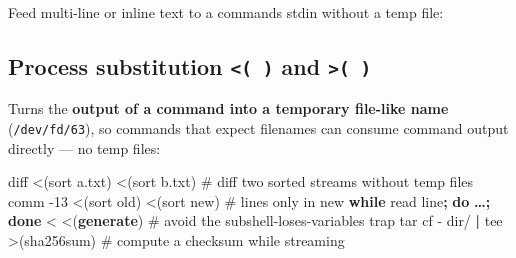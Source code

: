 \documentclass[11pt]{article}
\newenvironment{Shaded}{\begin{snugshade}}{\end{snugshade}}
\newcommand{\AttributeTok}[1]{\textcolor[rgb]{0.16,0.50,0.73}{#1}}
\newcommand{\BuiltInTok}[1]{\textcolor[rgb]{0.50,0.55,0.55}{#1}}
\newcommand{\CommentTok}[1]{\textcolor[rgb]{0.48,0.49,0.49}{#1}}
\newcommand{\ControlFlowTok}[1]{\textcolor[rgb]{0.99,0.74,0.29}{\textbf{#1}}}
\newcommand{\ExtensionTok}[1]{\textcolor[rgb]{0.00,0.60,1.00}{\textbf{#1}}}
\newcommand{\FunctionTok}[1]{\textcolor[rgb]{0.56,0.27,0.68}{#1}}
\newcommand{\KeywordTok}[1]{\textcolor[rgb]{0.81,0.81,0.76}{\textbf{#1}}}
\newcommand{\NormalTok}[1]{\textcolor[rgb]{0.81,0.81,0.76}{#1}}
\newcommand{\OperatorTok}[1]{\textcolor[rgb]{0.81,0.81,0.76}{#1}}
\newcommand{\StringTok}[1]{\textcolor[rgb]{0.96,0.31,0.31}{#1}}
\newcommand{\VariableTok}[1]{\textcolor[rgb]{0.15,0.68,0.68}{#1}}
\begin{document}
Feed multi-line or inline text to a command\textquotesingle s stdin without a temp file:


\begin{Shaded}
\end{Shaded}

\subsection{\texorpdfstring{Process substitution \texttt{\textless{}(\ )} and \texttt{\textgreater{}(\ )}}{Process substitution \textless( ) and \textgreater( )}}\label{process-substitution---and--}

Turns the \textbf{output of a command into a temporary file-like name} (\texttt{/dev/fd/63}), so commands that expect filenames can consume command output directly --- no temp files:


\begin{Shaded}
\begin{Highlighting}[]
\FunctionTok{diff} \OperatorTok{\textless{}(}\FunctionTok{sort}\NormalTok{ a.txt}\OperatorTok{)} \OperatorTok{\textless{}(}\FunctionTok{sort}\NormalTok{ b.txt}\OperatorTok{)}        \CommentTok{\# diff two sorted streams without temp files}
\FunctionTok{comm} \AttributeTok{{-}13} \OperatorTok{\textless{}(}\FunctionTok{sort}\NormalTok{ old}\OperatorTok{)} \OperatorTok{\textless{}(}\FunctionTok{sort}\NormalTok{ new}\OperatorTok{)}        \CommentTok{\# lines only in \textasciigrave{}new\textasciigrave{}}
\ControlFlowTok{while} \BuiltInTok{read} \VariableTok{line}\KeywordTok{;} \ControlFlowTok{do} \ExtensionTok{…}\KeywordTok{;} \ControlFlowTok{done} \OperatorTok{\textless{}} \OperatorTok{\textless{}(}\ExtensionTok{generate}\OperatorTok{)}   \CommentTok{\# avoid the subshell{-}loses{-}variables trap}
\FunctionTok{tar}\NormalTok{ cf }\AttributeTok{{-}}\NormalTok{ dir/ }\KeywordTok{|} \FunctionTok{tee} \OperatorTok{\textgreater{}(}\FunctionTok{sha256sum}\OperatorTok{)}        \CommentTok{\# compute a checksum while streaming}
\end{Highlighting}
\end{Shaded}
\end{document}
